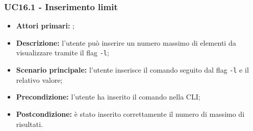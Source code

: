 \subsubsection{UC16.1 - Inserimento limit}
\begin{itemize}
	\item \textbf{Attori primari:} \us{};
	\item \textbf{Descrizione:} l’utente può inserire un numero massimo di elementi da visualizzare tramite il flag \texttt{-l}; 
	\item \textbf{Scenario principale:} l’utente inserisce il comando \history seguito dal flag \texttt{-l} e il relativo valore;
	\item \textbf{Precondizione:} l’utente ha inserito il comando \history{} nella CLI;
	\item \textbf{Postcondizione:} è stato inserito correttamente il numero di massimo di risultati.
\end{itemize}